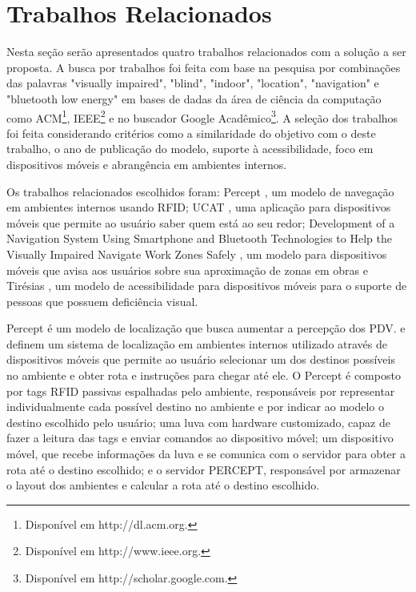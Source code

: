 \documentclass[twoside,english,brazilian]{UNISINOSartigo}
\begin{document}
\section{Trabalhos Relacionados}
Nesta seção serão apresentados quatro trabalhos relacionados com a solução a ser proposta. A busca por trabalhos foi feita com base na pesquisa por combinações das palavras "visually impaired", "blind", "indoor", "location", "navigation" e "bluetooth low energy" em bases de dadas da área de ciência da computação como ACM\footnote{Disponível em http://dl.acm.org.}, IEEE\footnote{Disponível em http://www.ieee.org.} e no buscador Google Acadêmico\footnote{Disponível em http://scholar.google.com.}. A seleção dos trabalhos foi feita considerando critérios como a similaridade do objetivo com o deste trabalho, o ano de publicação do modelo, suporte à acessibilidade, foco em dispositivos móveis e abrangência em ambientes internos. 

Os trabalhos relacionados escolhidos foram: Percept \cite{Ganz2011, Ganz2012}, um modelo de navegação em ambientes internos usando RFID; UCAT \cite{ucat2014}, uma aplicação para dispositivos móveis que permite ao usuário saber quem está ao seu redor; Development of a Navigation System Using Smartphone and Bluetooth Technologies to Help the Visually Impaired Navigate Work Zones Safely \cite{chen2014}, um modelo para dispositivos móveis que avisa aos usuários sobre sua aproximação de zonas em obras e Tirésias \cite{Falk2013}, um modelo de acessibilidade para dispositivos móveis para o suporte de pessoas que possuem deficiência visual.

Percept é um modelo de localização que busca aumentar a percepção dos PDV.  e  definem um sistema de localização em ambientes internos utilizado através de dispositivos móveis que permite ao usuário selecionar um dos destinos possíveis no ambiente e obter rota e instruções para chegar até ele. O Percept é composto por tags RFID passivas espalhadas pelo ambiente, responsáveis por representar individualmente cada possível destino no ambiente e por indicar ao modelo o destino escolhido pelo usuário; uma luva com hardware customizado, capaz de fazer a leitura das tags e enviar comandos ao dispositivo móvel; um dispositivo móvel, que recebe informações da luva e se comunica com o servidor para obter a rota até o destino escolhido; e o servidor PERCEPT, responsável por armazenar o layout dos ambientes e calcular a rota até o destino escolhido.
\end{document}
